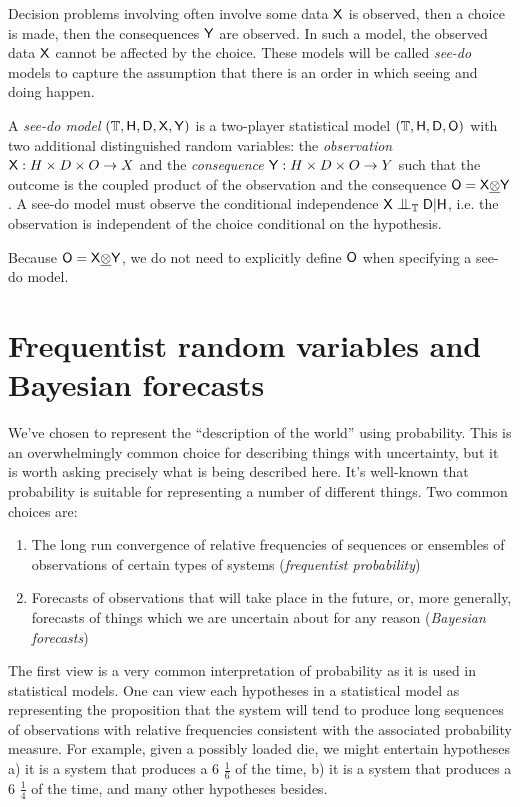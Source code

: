 Decision problems involving often involve some data $\mathsf{X}$ is observed, then a choice is made, then the consequences $\mathsf{Y}$ are observed. In such a model, the observed data $\mathsf{X}$ cannot be affected by the choice. These models will be called \emph{see-do} models to capture the assumption that there is an order in which seeing and doing happen.

\begin{definition}\label{def:seedo}
A \emph{see-do model} $(\mathbb{T},\mathsf{H},\mathsf{D},\mathsf{X},\mathsf{Y})$ is a two-player statistical model $(\mathbb{T},\mathsf{H},\mathsf{D},\mathsf{O})$ with two additional distinguished random variables: the \emph{observation} $\mathsf{X}: H\times D\times O\to X$ and the \emph{consequence} $\mathsf{Y}:H\times D\times O\to Y$ such that the outcome is the coupled product of the observation and the consequence $\mathsf{O}=\mathsf{X}\underline{\otimes}\mathsf{Y}$. A see-do model must observe the conditional independence $\RV{X}\CI_\kernel{T} \RV{D}|\RV{H}$, i.e. the observation is independent of the choice conditional on the hypothesis.

Because $\mathsf{O}=\mathsf{X}\underline{\otimes} \mathsf{Y}$, we do not need to explicitly define $\mathsf{O}$ when specifying a see-do model.
\end{definition}


\section{Frequentist random variables and Bayesian forecasts}

We've chosen to represent the ``description of the world'' using probability. This is an overwhelmingly common choice for describing things with uncertainty, but it is worth asking precisely what is being described here. It's well-known that probability is suitable for representing a number of different things. Two common choices are:

\begin{enumerate}
    \item The long run convergence of relative frequencies of sequences or ensembles of observations of certain types of systems (\emph{frequentist probability})
    \item Forecasts of observations that will take place in the future, or, more generally, forecasts of things which we are uncertain about for any reason (\emph{Bayesian forecasts})
\end{enumerate}

The first view is a very common interpretation of probability as it is used in statistical models. One can view each hypotheses in a statistical model as representing the proposition that the system will tend to produce long sequences of observations with relative frequencies consistent with the associated probability measure. For example, given a possibly loaded die, we might entertain hypotheses a) it is a system that produces a 6 $\frac{1}{6}$ of the time, b) it is a system that produces a 6 $\frac{1}{4}$ of the time, and many other hypotheses besides. 

